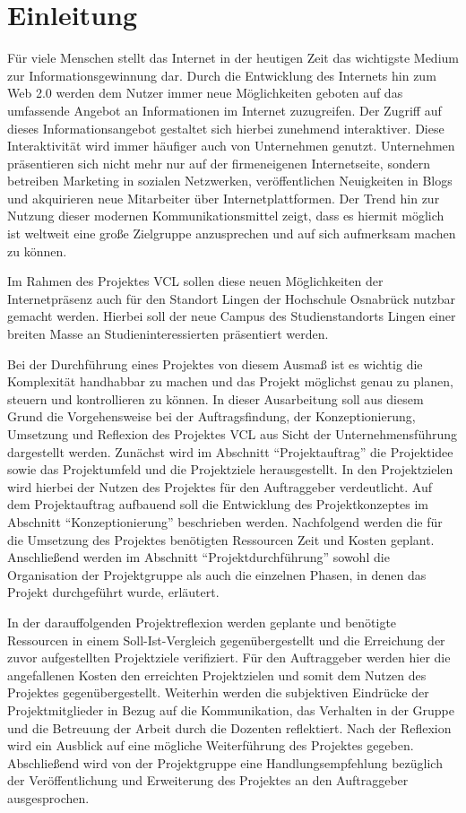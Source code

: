 \section{Einleitung}
\label{sec:Einleitung}
Für viele Menschen stellt das Internet in der heutigen Zeit das wichtigste
Medium zur Informationsgewinnung dar. Durch die Entwicklung des Internets hin
zum Web 2.0 werden dem Nutzer immer neue Möglichkeiten geboten auf das
umfassende Angebot an Informationen im Internet zuzugreifen. Der Zugriff auf
dieses Informationsangebot gestaltet sich hierbei zunehmend interaktiver.
Diese Interaktivität wird immer häufiger auch von Unternehmen genutzt.
Unternehmen präsentieren sich nicht mehr nur auf der firmeneigenen
Internetseite, sondern betreiben Marketing in sozialen Netzwerken,
veröffentlichen Neuigkeiten in Blogs und akquirieren neue Mitarbeiter über
Internetplattformen. Der Trend hin zur Nutzung dieser modernen
Kommunikationsmittel zeigt, dass es hiermit möglich ist weltweit eine große
Zielgruppe anzusprechen und auf sich aufmerksam machen zu können.

Im Rahmen des Projektes \ac{VCL} sollen diese neuen
Möglichkeiten der Internetpräsenz auch für den Standort Lingen der Hochschule
Osnabrück nutzbar gemacht werden. Hierbei soll der neue Campus des
Studienstandorts Lingen einer breiten Masse an Studieninteressierten
präsentiert werden.

Bei der Durchführung eines Projektes von diesem Ausmaß ist es wichtig die
Komplexität handhabbar zu machen und das Projekt möglichst genau zu planen,
steuern und kontrollieren zu können. In dieser Ausarbeitung soll aus diesem
Grund die Vorgehensweise bei der Auftragsfindung, der Konzeptionierung,
Umsetzung und Reflexion des Projektes \acs{VCL} aus Sicht der
Unternehmensführung dargestellt werden. Zunächst wird im Abschnitt
"`Projektauftrag"' die Projektidee sowie das Projektumfeld und die Projektziele
herausgestellt. In den Projektzielen wird hierbei der Nutzen des Projektes
für den Auftraggeber verdeutlicht. Auf dem Projektauftrag aufbauend soll
die Entwicklung des Projektkonzeptes im Abschnitt "`Konzeptionierung"'
beschrieben werden. Nachfolgend werden die für die Umsetzung des Projektes
benötigten Ressourcen Zeit und Kosten geplant. Anschließend werden im Abschnitt
"`Projektdurchführung"' sowohl die Organisation der Projektgruppe als auch die
einzelnen Phasen, in denen das Projekt durchgeführt wurde, erläutert.  

In der darauffolgenden Projektreflexion werden geplante und benötigte Ressourcen
in einem Soll-Ist-Vergleich gegenübergestellt und die Erreichung der zuvor
aufgestellten Projektziele verifiziert. Für den Auftraggeber werden hier die
angefallenen Kosten den erreichten Projektzielen und somit dem Nutzen des
Projektes gegenübergestellt. Weiterhin werden die subjektiven Eindrücke der
Projektmitglieder in Bezug auf die Kommunikation, das Verhalten in der Gruppe
und die Betreuung der Arbeit durch die Dozenten reflektiert. Nach der
Reflexion wird ein Ausblick auf eine mögliche Weiterführung des Projektes
gegeben. Abschließend wird von der Projektgruppe eine Handlungsempfehlung
bezüglich der Veröffentlichung und Erweiterung des Projektes an den Auftraggeber
ausgesprochen.